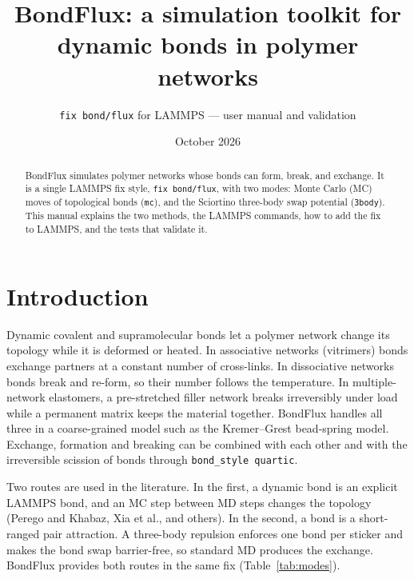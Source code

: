 \documentclass[a4paper]{tufte-handout}
\title[BondFlux]{BondFlux: a simulation toolkit for dynamic bonds in polymer networks}
\author[fix bond/flux]{\texttt{fix bond/flux} for LAMMPS --- user manual and validation}
\date{October 2026}
\newcommand{\cmd}[1]{\texttt{#1}}
\begin{document}
\maketitle

\begin{abstract}
\noindent
BondFlux simulates polymer networks whose bonds can form, break, and exchange. It is a single
LAMMPS fix style, \cmd{fix bond/flux}, with two modes: Monte Carlo (MC) moves of topological bonds
(\cmd{mc}), and the Sciortino three-body swap potential (\cmd{3body}). This manual explains the two
methods, the LAMMPS commands, how to add the fix to LAMMPS, and the tests that validate it.
\end{abstract}

\section{Introduction}

Dynamic covalent and supramolecular bonds let a polymer network change its topology while it is
deformed or heated. In associative networks (vitrimers) bonds exchange partners at a constant number
of cross-links.\cite{Montarnal2011} In dissociative networks bonds break and re-form, so their number
follows the temperature. In multiple-network elastomers, a pre-stretched filler network breaks
irreversibly under load while a permanent matrix keeps the material together.\cite{Ducrot2014}
BondFlux handles all three in a coarse-grained model such as the Kremer--Grest bead-spring
model.\cite{Kremer1990} Exchange, formation and breaking can be combined with each other and with
the irreversible scission of bonds through \cmd{bond\_style quartic}.

Two routes are used in the literature. In the first, a dynamic bond is an explicit LAMMPS bond, and
an MC step between MD steps changes the topology (Perego and Khabaz,\cite{Perego2020}
Xia et al.,\cite{Xia2023,Xia2024b} and others). In the second, a bond is a short-ranged pair attraction. A
three-body repulsion enforces one bond per sticker and makes the bond swap barrier-free, so standard
MD produces the exchange.\cite{Sciortino2017} BondFlux provides both routes in the same fix
(Table~\ref{tab:modes}).
\end{document}
